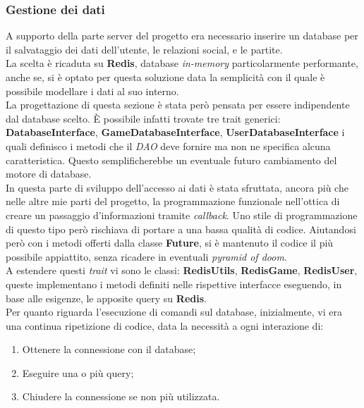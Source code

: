         \subsubsection{Gestione dei dati}
          A supporto della parte server del progetto era necessario inserire un database per il salvataggio dei dati dell'utente, le relazioni social, e le partite. 
          \\
          La scelta è ricaduta su \textbf{Redis}, database \textit{in-memory} particolarmente performante, anche se, si è optato per questa soluzione data la semplicità con il quale è possibile modellare i dati al suo interno.
          \\
          La progettazione di questa sezione è stata però pensata per essere indipendente dal database scelto. È possibile infatti trovate tre trait generici: \textbf{DatabaseInterface}, \textbf{GameDatabaseInterface}, \textbf{UserDatabaseInterface} i quali definisco i metodi che il \textit{DAO} deve fornire ma non ne specifica alcuna caratteristica. Questo semplificherebbe un eventuale futuro cambiamento del motore di database. \\
          In questa parte di sviluppo dell'accesso ai dati è stata sfruttata, ancora più che nelle altre mie parti del progetto, la programmazione funzionale nell'ottica di creare un passaggio d'informazioni tramite \textit{callback}. Uno stile di programmazione di questo tipo però rischiava di portare a una bassa qualità di codice. Aiutandosi però con i metodi offerti dalla classe \textbf{Future}, si è mantenuto il codice il più possibile appiattito, senza ricadere in eventuali \textit{pyramid of doom}.
          \\
          A estendere questi \textit{trait} vi sono le classi: \textbf{RedisUtils}, \textbf{RedisGame}, \textbf{RedisUser}, queste implementano i metodi definiti nelle rispettive interfacce eseguendo, in base alle esigenze, le apposite query su \textbf{Redis}.
          \\
          Per quanto riguarda l'esecuzione di comandi sul database, inizialmente, vi era una continua ripetizione di codice, data la necessità a ogni interazione di:
          
          \begin{enumerate}
           \item Ottenere la connessione con il database;
           \item Eseguire una o più query;
           \item Chiudere la connessione se non più utilizzata.
          \end{enumerate}
          
